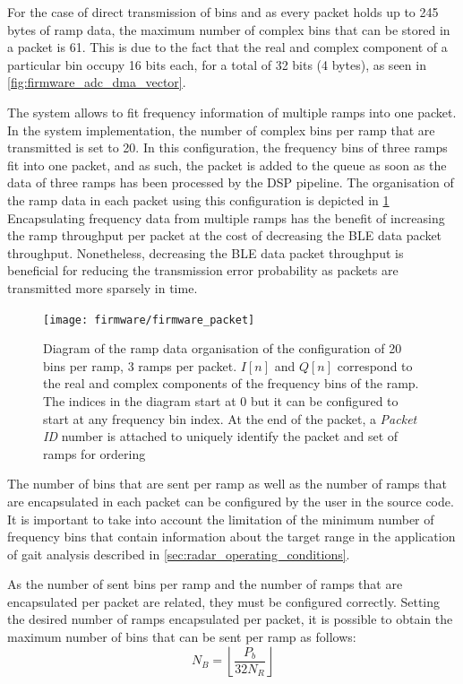For the case of direct transmission of bins and as every packet holds up to 245 bytes of ramp data, the maximum number of complex bins that can be stored in a packet is 61. This is due to the fact that the real and complex component of a particular bin occupy 16 bits each, for a total of 32 bits (4 bytes), as seen in \cref{fig:firmware_adc_dma_vector}.

The system allows to fit frequency information of multiple ramps into one packet. In the system implementation, the number of complex bins per ramp that are transmitted is set to 20. In this configuration, the frequency bins of three ramps fit into one packet, and as such, the packet is added to the queue as soon as the data of three ramps has been processed by the DSP pipeline. The organisation of the ramp data in each packet using this configuration is depicted in \cref{fig:firmware_packet} Encapsulating frequency data from multiple ramps has the benefit of increasing the ramp throughput per packet at the cost of decreasing the BLE data packet throughput. Nonetheless, decreasing the BLE data packet throughput is beneficial for reducing the transmission error probability as packets are transmitted more sparsely in time. %

\begin{figure}[ht]
	\centering
	\texttt{[image: firmware/firmware\_packet]}
	\caption{Diagram of the ramp data organisation of the configuration of 20 bins per ramp, 3 ramps per packet. $I[n]$ and $Q[n]$ correspond to the real and complex components of the frequency bins of the ramp. The indices in the diagram start at 0 but it can be configured to start at any frequency bin index. At the end of the packet, a \textit{Packet ID} number is attached to uniquely identify the packet and set of ramps for ordering
		\label{fig:firmware_packet}}
\end{figure}

The number of bins that are sent per ramp as well as the number of ramps that are encapsulated in each packet can be configured by the user in the source code. It is important to take into account the limitation of the minimum number of frequency bins that contain information about the target range in the application of gait analysis described in \cref{sec:radar_operating_conditions}.

As the number of sent bins per ramp and the number of ramps that are encapsulated per packet are related, they must be configured correctly. Setting the desired number of ramps encapsulated per packet, it is possible to obtain the maximum number of bins that can be sent per ramp as follows:
\begin{equation}
	N_B = \left\lfloor \frac{P_b}{32 N_R} \right\rfloor
\end{equation}

